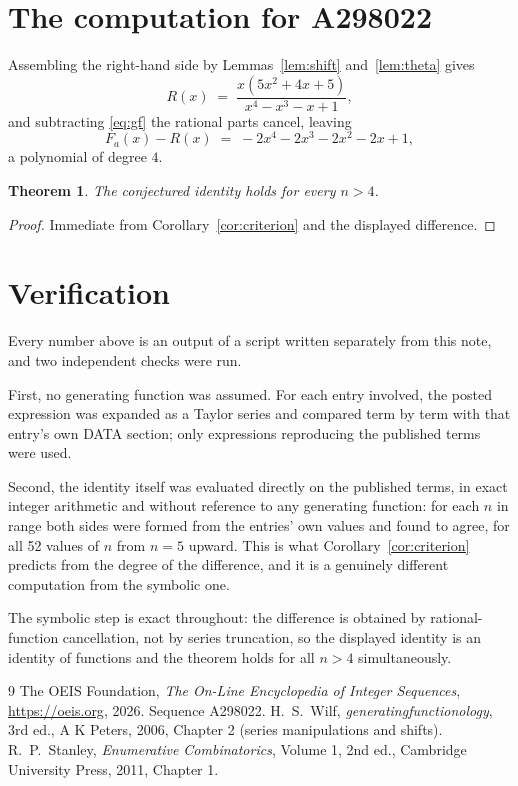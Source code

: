 \documentclass[11pt,a4paper]{article}
\theoremstyle{plain}
\newtheorem{theorem}{Theorem}
\theoremstyle{definition}
\begin{document}
\section{The computation for A298022}

Assembling the right-hand side by Lemmas~\ref{lem:shift} and~\ref{lem:theta} gives
\[
R(x)\;=\;\frac{x \left(5 x^{2} + 4 x + 5\right)}{x^{4} - x^{3} - x + 1} ,
\]
and subtracting \eqref{eq:gf} the rational parts cancel, leaving
\[
F_{a}(x)-R(x)\;=\;- 2 x^{4} - 2 x^{3} - 2 x^{2} - 2 x + 1 ,
\]
a polynomial of degree $4$.

\begin{theorem}
The conjectured identity holds for every $n>4$.
\end{theorem}

\begin{proof}
Immediate from Corollary~\ref{cor:criterion} and the displayed difference.
\end{proof}

\section{Verification}

Every number above is an output of a script written separately from this note, and two
independent checks were run.

First, no generating function was assumed. For each entry involved, the posted expression
was expanded as a Taylor series and compared term by term with that entry's own DATA
section; only expressions reproducing the published terms were used.

Second, the identity itself was evaluated directly on the published terms, in exact
integer arithmetic and without reference to any generating function: for each $n$ in range
both sides were formed from the entries' own values and found to agree, for all 52
values of $n$ from $n=5$ upward. This is what Corollary~\ref{cor:criterion}
predicts from the degree of the difference, and it is a genuinely different computation
from the symbolic one.

The symbolic step is exact throughout: the difference is obtained by rational-function
cancellation, not by series truncation, so the displayed identity is an identity of
functions and the theorem holds for all $n>4$ simultaneously.

\begin{thebibliography}{9}
 The OEIS Foundation, \emph{The On-Line Encyclopedia of Integer Sequences},
\url{https://oeis.org}, 2026. Sequence A298022.
 H.~S.~Wilf, \emph{generatingfunctionology}, 3rd ed., A K Peters, 2006,
Chapter 2 (series manipulations and shifts).
 R.~P.~Stanley, \emph{Enumerative Combinatorics}, Volume 1, 2nd ed.,
Cambridge University Press, 2011, Chapter 1.
\end{thebibliography}
\end{document}
